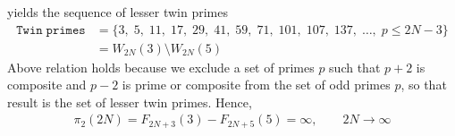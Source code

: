 yields the sequence of lesser twin primes
\begin{align*}
    \mathtt{Twin \; primes} &= \{ 3, \; 5, \; 11, \; 17, \; 29, \; 41, \; 59, \; 71, \; 101, \; 107, \; 137, \; \dots, \;  p \leq 2N - 3 \} \\
    &= W_{2N}(3) \setminus W_{2N}(5)
\end{align*}
Above relation holds because we exclude a set of primes $p$ such that $p+2$ is composite and $p-2$ is prime or composite from
the set of odd primes $p$, so that result is the set of lesser twin primes.
Hence,
\begin{align*}
    \pi_2 (2N) = F_{2N+3}(3) - F_{2N+5}(5) = \infty, \quad \quad 2N \to \infty
\end{align*}
